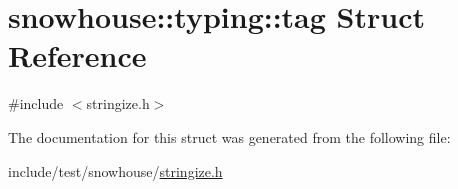 \hypertarget{structsnowhouse_1_1typing_1_1tag}{}\section{snowhouse\+::typing\+::tag Struct Reference}
\label{structsnowhouse_1_1typing_1_1tag}


{\ttfamily \#include $<$stringize.\+h$>$}



The documentation for this struct was generated from the following file\+:\begin{DoxyCompactItemize}
\item 
include/test/snowhouse/\mbox{\hyperlink{stringize_8h}{stringize.\+h}}\end{DoxyCompactItemize}
